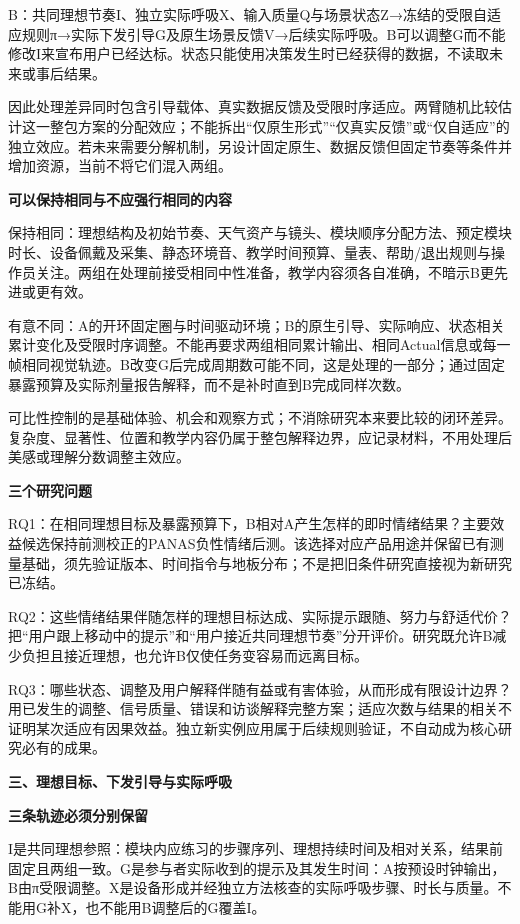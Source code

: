 \documentclass[11pt,a4paper]{article}
\newcommand{\reviewsection}[1]{\par\Needspace{9\baselineskip}\vspace{10pt}\begin{center}{\titlelatin\titlecjk\bfseries\fontsize{14}{20}\selectfont #1}\end{center}}
\newcommand{\reviewsubsection}[1]{\par\Needspace{4\baselineskip}\vspace{4pt}\begin{center}{\titlelatin\titlecjk\bfseries\fontsize{12}{18}\selectfont #1}\end{center}}
\begin{document}
B：共同理想节奏I、独立实际呼吸X、输入质量Q与场景状态Z→冻结的受限自适应规则π→实际下发引导G及原生场景反馈V→后续实际呼吸。B可以调整G而不能修改I来宣布用户已经达标。状态只能使用决策发生时已经获得的数据，不读取未来或事后结果。


因此处理差异同时包含引导载体、真实数据反馈及受限时序适应。两臂随机比较估计这一整包方案的分配效应；不能拆出“仅原生形式”“仅真实反馈”或“仅自适应”的独立效应。若未来需要分解机制，另设计固定原生、数据反馈但固定节奏等条件并增加资源，当前不将它们混入两组。


\reviewsubsection{2.2 可以保持相同与不应强行相同的内容}
保持相同：理想结构及初始节奏、天气资产与镜头、模块顺序分配方法、预定模块时长、设备佩戴及采集、静态环境音、教学时间预算、量表、帮助/\allowbreak{}退出规则与操作员关注。两组在处理前接受相同中性准备，教学内容须各自准确，不暗示B更先进或更有效。


有意不同：A的开环固定圈与时间驱动环境；B的原生引导、实际响应、状态相关累计变化及受限时序调整。不能再要求两组相同累计输出、相同Actual信息或每一帧相同视觉轨迹。B改变G后完成周期数可能不同，这是处理的一部分；通过固定暴露预算及实际剂量报告解释，而不是补时直到B完成同样次数。


可比性控制的是基础体验、机会和观察方式；不消除研究本来要比较的闭环差异。复杂度、显著性、位置和教学内容仍属于整包解释边界，应记录材料，不用处理后美感或理解分数调整主效应。


\reviewsubsection{2.3 三个研究问题}
RQ1：在相同理想目标及暴露预算下，B相对A产生怎样的即时情绪结果？主要效益候选保持前测校正的PANAS负性情绪后测。该选择对应产品用途并保留已有测量基础，须先验证版本、时间指令与地板分布；不是把旧条件研究直接视为新研究已冻结。


RQ2：这些情绪结果伴随怎样的理想目标达成、实际提示跟随、努力与舒适代价？把“用户跟上移动中的提示”和“用户接近共同理想节奏”分开评价。研究既允许B减少负担且接近理想，也允许B仅使任务变容易而远离目标。


RQ3：哪些状态、调整及用户解释伴随有益或有害体验，从而形成有限设计边界？用已发生的调整、信号质量、错误和访谈解释完整方案；适应次数与结果的相关不证明某次适应有因果效益。独立新实例应用属于后续规则验证，不自动成为核心研究必有的成果。


\reviewsection{三、理想目标、下发引导与实际呼吸}
\reviewsubsection{3.1 三条轨迹必须分别保留}
I是共同理想参照：模块内应练习的步骤序列、理想持续时间及相对关系，结果前固定且两组一致。G是参与者实际收到的提示及其发生时间：A按预设时钟输出，B由π受限调整。X是设备形成并经独立方法核查的实际呼吸步骤、时长与质量。不能用G补X，也不能用B调整后的G覆盖I。
\end{document}
